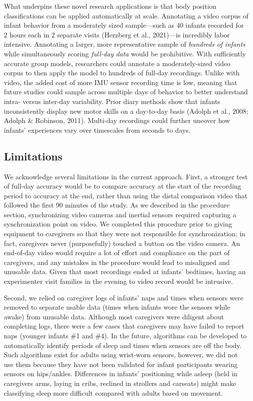 \documentclass[
  man]{apa6}
\begin{document}
What underpins these novel research applications is that body position classifications can be applied automatically at scale. Annotating a video corpus of infant behavior from a moderately sized sample---such as 40 infants recorded for 2 hours each in 2 separate visits (Herzberg et al., 2021)---is incredibly labor intensive. Annotating a larger, more representative sample of \emph{hundreds of infants} while simultaneously scoring \emph{full-day data} would be prohibitive. With sufficiently accurate group models, researchers could annotate a moderately-sized video corpus to then apply the model to hundreds of full-day recordings. Unlike with video, the added cost of more IMU sensor recording time is low, meaning that future studies could sample across multiple days of behavior to better understand intra- versus inter-day variability. Prior diary methods show that infants inconsistently display new motor skills on a day-to-day basis (Adolph et al., 2008; Adolph \& Robinson, 2011). Multi-day recordings could further uncover how infants' experiences vary over timescales from seconds to days.

\hypertarget{limitations}{%
\subsection{Limitations}\label{limitations}}

We acknowledge several limitations in the current approach. First, a stronger test of full-day accuracy would be to compare accuracy at the start of the recording period to accuracy at the end, rather than using the distal comparison video that followed the first 90 minutes of the study. As we described in the procedure section, synchronizing video cameras and inertial sensors required capturing a synchronization point on video. We completed this procedure prior to giving equipment to caregivers so that they were not responsible for synchronization; in fact, caregivers never (purposefully) touched a button on the video camera. An end-of-day video would require a lot of effort and compliance on the part of caregivers, and any mistakes in the procedure would lead to misaligned and unusable data. Given that most recordings ended at infants' bedtimes, having an experimenter visit families in the evening to video record would be intrusive.

Second, we relied on caregiver logs of infants' naps and times when sensors were removed to separate usable data (times when infants wore the sensors while awake) from unusable data. Although most caregivers were diligent about completing logs, there were a few cases that caregivers may have failed to report naps (younger infants \#1 and \#4). In the future, algorithms can be developed to automatically identify periods of sleep and times when sensors are off the body. Such algorithms exist for adults using wrist-worn sensors, however, we did not use them because they have not been validated for infant participants wearing sensors on hips/ankles. Differences in infants' positioning while asleep (held in caregivers arms, laying in cribs, reclined in strollers and carseats) might make classifying sleep more difficult compared with adults based on movement.
\end{document}
